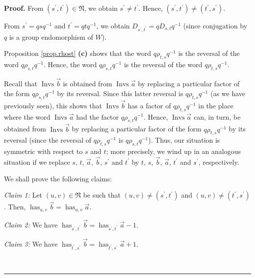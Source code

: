 \documentclass
[numbers=enddot,12pt,final,onecolumn,notitlepage,abstracton]{scrartcl}%
\theoremstyle{definition}
\newenvironment{proof}[1][Proof]{\noindent\textbf{#1.} }{\ \rule{0.5em}{0.5em}}
\begin{document}
\begin{proof}
From $\left(  s^{\prime},t^{\prime}\right)  \in\mathfrak{N}$, we obtain
$s^{\prime}\neq t^{\prime}$. Hence, $\left(  s^{\prime},t^{\prime}\right)
\neq\left(  t^{\prime},s^{\prime}\right)  $.

From $s^{\prime}=qsq^{-1}$ and $t^{\prime}=qtq^{-1}$, we obtain $D_{s^{\prime
},t^{\prime}}=qD_{s,t}q^{-1}$ (since conjugation by $q$ is a group
endomorphism of $W$).

Proposition \ref{prop.rhost} \textbf{(c)} shows that the word $q\rho
_{t,s}q^{-1}$ is the reversal of the word $q\rho_{s,t}q^{-1}$. Hence, the word
$q\rho_{s,t}q^{-1}$ is the reversal of the word $q\rho_{t,s}q^{-1}$.

Recall that $\operatorname*{Invs}\overrightarrow{b}$ is obtained from
$\operatorname*{Invs}\overrightarrow{a}$ by replacing a particular factor of
the form $q\rho_{s,t}q^{-1}$ by its reversal. Since this latter reversal is
$q\rho_{t,s}q^{-1}$ (as we have previously seen), this shows that
$\operatorname*{Invs}\overrightarrow{b}$ has a factor of $q\rho_{t,s}q^{-1}$
in the place where the word $\operatorname*{Invs}\overrightarrow{a}$ had the
factor $q\rho_{s,t}q^{-1}$. Hence, $\operatorname*{Invs}\overrightarrow{a}$
can, in turn, be obtained from $\operatorname*{Invs}\overrightarrow{b}$ by
replacing a particular factor of the form $q\rho_{t,s}q^{-1}$ by its reversal
(since the reversal of $q\rho_{t,s}q^{-1}$ is $q\rho_{s,t}q^{-1}$). Thus, our
situation is symmetric with respect to $s$ and $t$; more precisely, we wind up
in an analogous situation if we replace $s$, $t$, $\overrightarrow{a}$,
$\overrightarrow{b}$, $s^{\prime}$ and $t^{\prime}$ by $t$, $s$,
$\overrightarrow{b}$, $\overrightarrow{a}$, $t^{\prime}$ and $s^{\prime}$, respectively.

We shall prove the following claims:

\textit{Claim 1:} Let $\left(  u,v\right)  \in\mathfrak{N}$ be such that
$\left(  u,v\right)  \neq\left(  s^{\prime},t^{\prime}\right)  $ and $\left(
u,v\right)  \neq\left(  t^{\prime},s^{\prime}\right)  $. Then,
$\operatorname*{has}\nolimits_{u,v}\overrightarrow{b}=\operatorname*{has}%
\nolimits_{u,v}\overrightarrow{a}$.

\textit{Claim 2:} We have $\operatorname*{has}\nolimits_{s^{\prime},t^{\prime
}}\overrightarrow{b}=\operatorname*{has}\nolimits_{s^{\prime},t^{\prime}%
}\overrightarrow{a}-1$.

\textit{Claim 3:} We have $\operatorname*{has}\nolimits_{t^{\prime},s^{\prime
}}\overrightarrow{b}=\operatorname*{has}\nolimits_{t^{\prime},s^{\prime}%
}\overrightarrow{a}+1$.


\end{proof}
\end{document}
